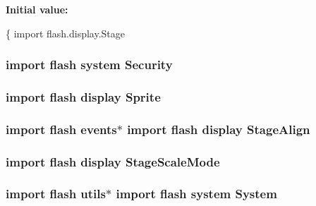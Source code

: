 {\bfseries Initial value\+:}
\begin{DoxyCode}
\{
    \textcolor{keyword}{import} flash.display.Stage
\end{DoxyCode}
\hypertarget{_zero_clipboard_8as_ae6834b84bc690e04dba52c72b66ee901}{
\subsubsection[{Security}]{\setlength{\rightskip}{0pt plus 5cm}import flash system Security}}\label{_zero_clipboard_8as_ae6834b84bc690e04dba52c72b66ee901}
\hypertarget{_zero_clipboard_8as_a042194dccb28a568ca64f8525721c60a}{
\subsubsection[{Sprite}]{\setlength{\rightskip}{0pt plus 5cm}import flash display Sprite}}\label{_zero_clipboard_8as_a042194dccb28a568ca64f8525721c60a}
\hypertarget{_zero_clipboard_8as_a65934e40e78800e97f0a74d031566cf3}{
\subsubsection[{Stage\+Align}]{\setlength{\rightskip}{0pt plus 5cm}import flash events$\ast$ import flash display Stage\+Align}}\label{_zero_clipboard_8as_a65934e40e78800e97f0a74d031566cf3}
\hypertarget{_zero_clipboard_8as_a9712fefc0286413e0d285a5b0fd83376}{
\subsubsection[{Stage\+Scale\+Mode}]{\setlength{\rightskip}{0pt plus 5cm}import flash display Stage\+Scale\+Mode}}\label{_zero_clipboard_8as_a9712fefc0286413e0d285a5b0fd83376}
\hypertarget{_zero_clipboard_8as_aa9096e3fcab84f69b6438f42c99b82a7}{
\subsubsection[{System}]{\setlength{\rightskip}{0pt plus 5cm}import flash utils$\ast$ import flash system System}}\label{_zero_clipboard_8as_aa9096e3fcab84f69b6438f42c99b82a7}
